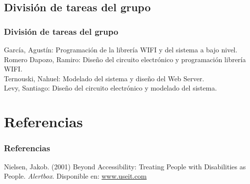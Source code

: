 \subsection{División de tareas del grupo}
\begin{frame}
	\frametitle{División de tareas del grupo}
	García, Agustín: Programación de la librería WIFI y del sistema a bajo nivel.
	\\Romero Dapozo, Ramiro: Diseño del circuito electrónico y programación librería WIFI.
	\\Ternouski, Nahuel: Modelado del sistema y diseño del Web Server.
	\\Levy, Santiago: Diseño del circuito electrónico y modelado del sistema.

\end{frame}

\section{Referencias}

\begin{frame}
	\frametitle{Referencias}
	\footnotesize{
	\begin{thebibliography}{99}
		 Nielsen, Jakob. (2001)
		\newblock Beyond Accessibility: Treating People with Disabilities as People.
		\newblock \emph{Alertbox}.
		Disponible en:
		\href{http://www.useit.com/alertbox/20011111.html}{www.useit.com}
	\end{thebibliography}
	}
\end{frame}